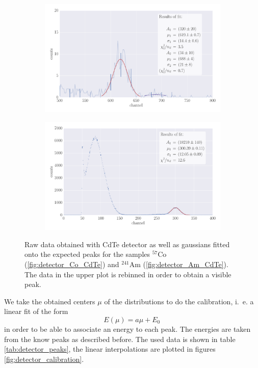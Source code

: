 \begin{figure}
    \centering
    \begin{subfigure}[b]{\pltw}
        \includegraphics[width=1.0\linewidth]{figures/detector_Co_Si}
        \caption{}
        \label{fig:detector_Co_Si}
    \end{subfigure}
    \begin{subfigure}[b]{\pltw}
        \includegraphics[width=1.0\linewidth]{figures/detector_Am_Si}
        \caption{}
        \label{fig:detector_Am_Si}
    \end{subfigure}
    \caption{
        Raw data obtained with CdTe detector as well as gaussians fitted 
        onto the expected peaks for the samples $^{57}$Co (\ref{fig:detector_Co_CdTe})
        and $^{241}$Am (\ref{fig:detector_Am_CdTe}). The data in the upper plot is rebinned 
        in order to obtain a visible peak.
        }
    \label{fig:detector_Si}
\end{figure}

We take the obtained centers $\mu$ of the distributions to do the calibration, 
i.~e. a linear fit of the form 
\begin{equation}
    E(\mu) = a \mu + E_0 \,
\end{equation}
in order to be able to associate an energy to each peak. The energies 
are taken from the know peaks as described before. The used data is shown in table 
\ref{tab:detector_peaks}, the linear interpolations are plotted in 
figures \ref{fig:detector_calibration}. 

